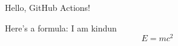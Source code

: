 \documentclass{article}
\begin{document}
Hello, GitHub Actions!

Here's a formula:
I am kindun
\[
E = mc^2
\]
\end{document}
